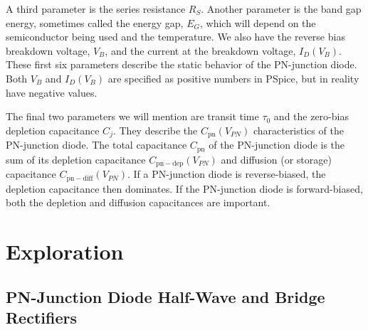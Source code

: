 \documentclass[12pt]{../manual}
\begin{document}
A third parameter is the series resistance $R_S$. Another parameter is the band gap energy, sometimes called the energy gap, $E_G$, which will depend on the semiconductor being used and the temperature. We also have the reverse bias breakdown voltage, $V_B$, and the current at the breakdown voltage, $I_D(V_B)$. These first six parameters describe the static behavior of the PN-junction diode. Both $V_B$ and $I_D(V_B)$ are specified as positive numbers in PSpice, but in reality have negative values.

The final two parameters we will mention are transit time $\tau_0$ and the zero-bias depletion capacitance $C_j$. They describe the $C_{\mathrm{pn}}(V_{PN})$ characteristics of the PN-junction diode. The total capacitance $C_{\mathrm{pn}}$ of the PN-junction diode is the sum of its depletion capacitance $C_{\mathrm{pn-dep}}(V_{PN})$ and diffusion (or storage) capacitance $C_{\mathrm{pn-diff}}(V_{PN})$. If a PN-junction diode is reverse-biased, the depletion capacitance then dominates. If the PN-junction diode is forward-biased, both the depletion and diffusion capacitances are important.


\newpage
\section{Exploration}
\subsection{PN-Junction Diode Half-Wave and Bridge Rectifiers}
\end{document}
